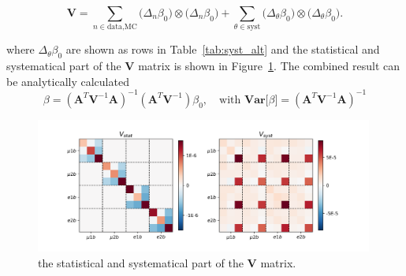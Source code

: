 \begin{equation}
    \textbf{V} =
    \sum_{n \in \text{data,MC}} \big( \Delta_{n}\beta_0 \big) \otimes   \big( \Delta_{n}\beta_0 \big) +
    \sum_{\theta \in \text{syst}} \big( \Delta_{\theta}\beta_0 \big) \otimes  \big( \Delta_{\theta}\beta_0 \big).
\end{equation}

\noindent where $\Delta_{\theta}\beta_0$ are shown as rows in Table~\ref{tab:syst_alt} and the statistical and systematical part
of the $\textbf{V}$ matrix is shown in Figure~\ref{fig:corBetaBar}. The combined result can 
be analytically calculated 
\begin{equation}
    \beta =   (\textbf{A}^T \textbf{V}^{-1} \textbf{A})^{-1}(\textbf{A}^T \textbf{V}^{-1}) \beta_0 , \quad
    \text{with } \textbf{Var}\big[\beta\big]  =   (\textbf{A}^T \textbf{V}^{-1} \textbf{A})^{-1}
\end{equation}

\begin{figure}[ht]
    \centering
    \includegraphics[width=0.99\textwidth]{chapters/Analysis/sectionSystematics/figures/covarMatrix_total.png}
    \caption{ the statistical and systematical part of the $\textbf{V}$ matrix. }
    \label{fig:corBetaBar}
\end{figure}



\FloatBarrier





